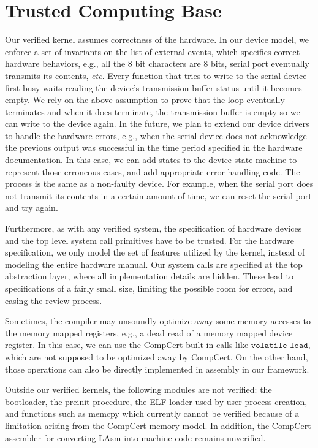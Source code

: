 
\section{Trusted Computing Base}
Our verified kernel assumes correctness of the hardware.  In our
device model, we enforce a set of invariants on the list of external
events, which specifies correct hardware behaviors, e.g., all the 8
bit characters are 8 bits, serial port eventually transmits its
contents, {\it etc}. Every function that tries to write to the
serial device first busy-waits reading the device's transmission
buffer status until it becomes empty. We rely on the above assumption
to prove that the loop eventually terminates and when it does
terminate, the transmission buffer is empty so we can write to the
device again.  In the future, we plan to extend our device drivers to
handle the hardware errors, e.g., when the serial device does not
acknowledge the previous output was successful in the time period
specified in the hardware documentation.  In this case, we can add
states to the device state machine to represent those erroneous cases,
and add appropriate error handling code. The process is the same as a
non-faulty device. For example, when the serial port does not transmit
its contents in a certain amount of time, we can reset the serial port
and try again.

Furthermore, as with any verified system, the specification of
hardware devices and the top level system call primitives have to be
trusted.  For the hardware specification, we only model the set of
features utilized by the kernel, instead of modeling the entire
hardware manual.  Our system calls are specified at the top
abstraction layer, where all implementation details are hidden.  These
lead to specifications of a fairly small size,
limiting the possible room for errors, and easing the review process.

Sometimes, the compiler may unsoundly optimize away some memory
accesses to the memory mapped registers, e.g., a dead read of a
memory mapped device register. In this case, we can use the
CompCert built-in calls like $\texttt{volatile\_load}$, which are
not supposed to be optimized away by CompCert. On the other hand,
those operations can also be directly implemented in assembly in
our framework.

Outside our verified kernels, the following modules are not verified:
the bootloader, the preinit procedure,
the ELF loader used by user process creation, and functions such as
memcpy which currently cannot be verified because of a limitation
arising from the CompCert memory model. In addition, the CompCert assembler for
converting LAsm into machine code remains unverified.

